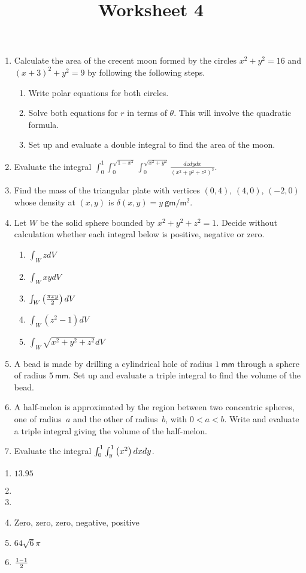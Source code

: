 \documentclass[12pt]{article}
\title{Worksheet 4}
\author{}\date{}
\let\sin\relax\DeclareMathOperator{\sin}{\mathsf{sin}}
\let\cos\relax\DeclareMathOperator{\cos}{\mathsf{cos}}
\begin{document}
\maketitle
\thispagestyle{empty}

\begin{enumerate}
\item Calculate the area of the crecent moon formed by
the circles $x^2+y^2=16$ and $\left(x+3\right)^2+y^2=9$
by following the following steps.
\begin{enumerate}
\item Write polar equations for both circles.
\item Solve both equations for $r$ in terms of $\theta$. This
will involve the quadratic formula.
\item Set up and evaluate a double integral to find the area
of the moon.
\end{enumerate}

\item Evaluate the integral
$\int_0^1\int_0^{\sqrt{1-x^2}}\int_0^{\sqrt{x^2+y^2}}
\frac{dzdydx}{\left(x^2+y^2+z^2\right)^2}$.

\item Find the mass of the triangular plate with vertices
$\left(0,4\right)$, $\left(4,0\right)$, $\left(-2,0\right)$
whose density at $\left(x,y\right)$ is $\delta\left(x,y\right)
=y~\mathsf{gm}/\mathsf{m}^2$.

\item Let $W$ be the solid sphere bounded by $x^2+y^2+z^2=1$.
Decide without calculation whether each integral below
is positive, negative or zero.
\begin{enumerate}
\item $\int_WzdV$
\item $\int_WxydV$
\item $\int_W\sin\left(\frac{\pi xy}{2}\right)dV$
\item $\int_W\left(z^2-1\right)dV$
\item $\int_W\sqrt{x^2+y^2+z^2}dV$
\end{enumerate}

\item A bead is made by drilling a cylindrical
hole of radius $1~\mathsf{mm}$ through a sphere
of radius $5~\mathsf{mm}$. Set up and evaluate
a triple integral to find the volume of the bead.

\item A half-melon is approximated by the region
between two concentric spheres, one of radius~$a$
and the other of radius~$b$, with $0<a<b$. Write
and evaluate a triple integral giving the volume
of the half-melon.

\item Evaluate the integral
$\int_0^1\int_y^1\sin\left(x^2\right)dxdy$.

\end{enumerate}

\begin{enumerate}
\item $13.95$
\item
\item
\item Zero, zero, zero, negative, positive
\item $64\sqrt{6}\pi$
\item $\frac{1-\cos{1}}{2}$
\end{enumerate}
\end{document}
